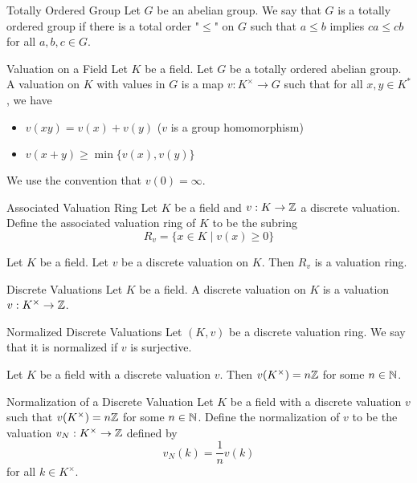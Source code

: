 \documentclass[a4paper]{article}
\begin{document}
\begin{defn}{Totally Ordered Group}{} Let $G$ be an abelian group. We say that $G$ is a totally ordered group if there is a total order "$\leq$" on $G$ such that $a\leq b$ implies $ca\leq cb$ for all $a,b,c\in G$. 
\end{defn}

\begin{defn}{Valuation on a Field}{} Let $K$ be a field. Let $G$ be a totally ordered abelian group. A valuation on $K$ with values in $G$ is a map $v:K^\times\to G$ such that for all $x,y\in K^\ast$, we have 
\begin{itemize}
\item $v(xy)=v(x)+v(y)$ ($v$ is a group homomorphism)
\item $v(x+y)\geq\min\{v(x),v(y)\}$
\end{itemize}
We use the convention that $v(0)=\infty$. 
\end{defn}

\begin{defn}{Associated Valuation Ring}{} Let $K$ be a field and $v:K\to\mathbb{Z}$ a discrete valuation. Define the associated valuation ring of $K$ to be the subring $$R_v=\{x\in K\;|\;v(x)\geq 0\}$$
\end{defn}

\begin{lmm}{}{} Let $K$ be a field. Let $v$ be a discrete valuation on $K$. Then $R_v$ is a valuation ring. 
\end{lmm}

\begin{defn}{Discrete Valuations}{} Let $K$ be a field. A discrete valuation on $K$ is a valuation $v:K^\times\to\mathbb{Z}$. 
\end{defn}

\begin{defn}{Normalized Discrete Valuations}{} Let $(K,v)$ be a discrete valuation ring. We say that it is normalized if $v$ is surjective. 
\end{defn}

\begin{lmm}{}{} Let $K$ be a field with a discrete valuation $v$. Then $v(K^\times)=n\mathbb{Z}$ for some $n\in\mathbb{N}$. 
\end{lmm}

\begin{lmm}{Normalization of a Discrete Valuation}{} Let $K$ be a field with a discrete valuation $v$ such that $v(K^\times)=n\mathbb{Z}$ for some $n\in\mathbb{N}$. Define the normalization of $v$ to be the valuation $v_N:K^\times\to\mathbb{Z}$ defined by $$v_N(k)=\frac{1}{n}v(k)$$ for all $k\in K^\times$. 
\end{lmm}
\end{document}
